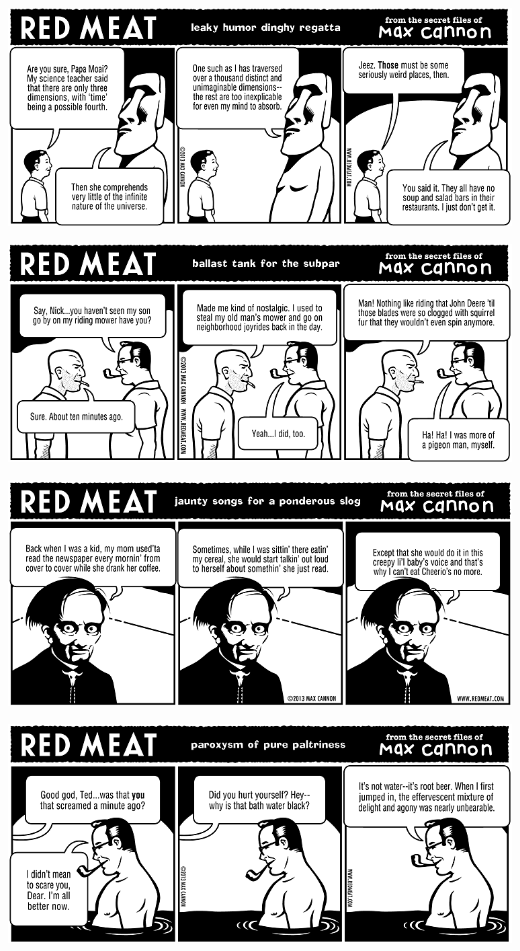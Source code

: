 \documentclass[a4paper,twoside,11pt]{article}
\begin{document}
\includegraphics[width=\textwidth]{redmeat_2013-02-05.png}



\includegraphics[width=\textwidth]{redmeat_2013-02-12.png}



\includegraphics[width=\textwidth]{redmeat_2013-02-19.png}



\includegraphics[width=\textwidth]{redmeat_2013-02-26.png}
\end{document}
